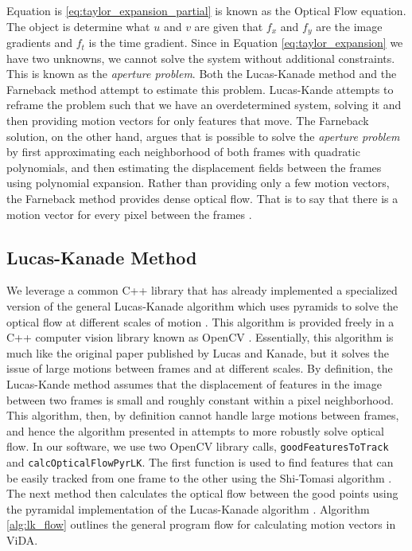  Equation is \ref{eq:taylor_expansion_partial} is known as the Optical Flow
 equation. The object is determine what $u$ and $v$ are given that $f_x$ and
 $f_y$ are the image gradients and $f_t$ is the time gradient. Since in Equation
 \ref{eq:taylor_expansion} we have two unknowns, we cannot solve the system
 without additional constraints. This is known as the \textit{aperture problem}.
 Both the Lucas-Kanade method and the Farneback method attempt to estimate this
 problem. Lucas-Kande attempts to reframe the problem such that we have an
 overdetermined system, solving it and then providing motion vectors for only
 features that move. The Farneback solution, on the other hand, argues that is
 possible to solve the \textit{aperture problem} by first approximating each
 neighborhood of both frames with quadratic polynomials, and then estimating the
 displacement fields between the frames using polynomial expansion. Rather than
 providing only a few motion vectors, the Farneback method provides dense
 optical flow. That is to say that there is a motion vector for every pixel
 between the frames \cite{farneback2003two}.

\subsection{\label{subsection:lucas_kanade} Lucas-Kanade Method}
We leverage a common C++ library that has already implemented a
specialized version of the general Lucas-Kanade algorithm which uses pyramids to
solve the optical flow at different scales of motion
\cite{bouguet2001pyramidal}. This algorithm is provided freely in a C++ computer
vision library known as OpenCV \cite{itseez2015opencv}. Essentially, this
algorithm is much like the original paper published by Lucas and Kanade, but it
solves the issue of large motions between frames and at different scales. By definition, the Lucas-Kande
method assumes that the displacement of features in the image between two frames
is small and roughly constant within a pixel neighborhood. This algorithm, then,
by definition cannot handle large motions between frames, and hence the algorithm
presented in \cite{bouguet2001pyramidal} attempts to more robustly solve
optical flow. In our software, we use two OpenCV library calls, \texttt{goodFeaturesToTrack}
and \texttt{calcOpticalFlowPyrLK}. The first function is used to find features
that can be easily tracked from one frame to the other using the Shi-Tomasi
algorithm \cite{shi1994good}. The next method then calculates the optical flow
between the good points using the pyramidal implementation of the Lucas-Kanade
algorithm \cite{bouguet2001pyramidal}. Algorithm \ref{alg:lk_flow} outlines the general
program flow for calculating motion vectors in ViDA.

